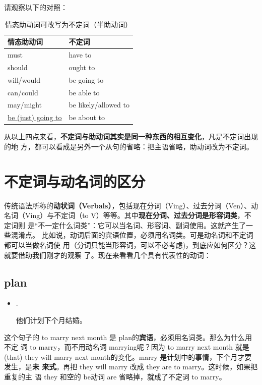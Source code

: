 请观察以下的对照：
\begin{longtable}[]{@{}ll@{}}
  \caption{\label{tab:modalinf}情态助动词可改写为不定词（半助动词）}
  \toprule
  情态助动词 & 不定词\\\midrule
  must & have to \\
  should & ought to \\
  will/would & be going to \\
  can/could & be able to \\
  may/might & be likely/allowed  to \\
  \ul{be (just) going to} & be about to \\
  \bottomrule
\end{longtable}
从以上四点来看，\textbf{不定词与助动词其实是同一种东西的相互变化}，凡是不定词出现的地
方，都可以看成是另外一个从句的省略：把主语省略，助动词改为不定词。

\section{不定词与动名词的区分}

传统语法所称的\textbf{动状词（Verbals）}，包括现在分词（Ving）、过去分词（Ven）、动
名词（Ving）与不定词（to V）等等。其中\textbf{现在分词、过去分词是形容词类}，不定词则
是“不一定什么词类”：它可以当名词、形容词、副词使用。这就产生了一些混淆点。
比如说，动词后面的宾语位置，必须用名词类。可是动名词和不定词都可以当做名词使
用（分词只能当形容词，可以不必考虑)，到底应如何区分？这就要借助我们刚才的观察
了。现在来看看几个具有代表性的动词：

\subsection{plan}

\begin{itemize}
\item  {}  .

  他们计划下个月结婚。
\end{itemize}

这个句子的 to marry next month 是 plan的\textbf{宾语}，必须用名词类。那么为什么用不定
词 to marry，而不用动名词 marrying呢？因为 to marry next month 就是 (that)
they will marry next month的变化。marry 是计划中的事情，下个月才要发生，是\textbf{未
  来式}。再把 they will marry 改成 they are to marry。这时候，如果把重复的主
语 they 和空的 be动词 are 省略掉，就成了不定词 to marry。

